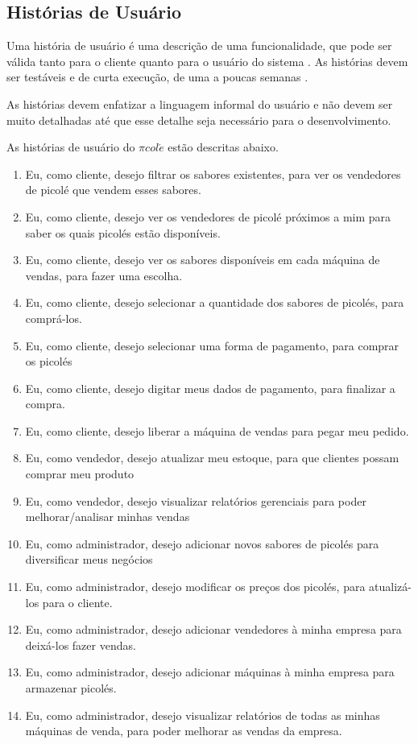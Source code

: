 \subsection{Histórias de Usuário}
\label{sec:historias}

Uma história de usuário é uma descrição de uma funcionalidade, que pode ser válida tanto para o cliente quanto para o usuário do sistema \cite{cohn2004user}. As histórias devem ser testáveis e de curta execução, de uma a poucas semanas \cite{breitman}.

As histórias devem enfatizar a linguagem informal do usuário e não devem ser muito detalhadas até que esse detalhe seja necessário para o desenvolvimento. \cite{cohn2004advantages}

As histórias de usuário do $\pi col\acute{e}$ estão descritas abaixo.

\begin{enumerate}
\item Eu, como cliente, desejo filtrar os sabores existentes, para ver os vendedores de picolé que vendem esses sabores.
\item Eu, como cliente, desejo ver os vendedores de picolé próximos a mim para saber os quais picolés estão disponíveis.
\item Eu, como cliente, desejo ver os sabores disponíveis em cada máquina de vendas, para fazer uma escolha.
\item Eu, como cliente, desejo selecionar a quantidade dos sabores de picolés, para comprá-los.
\item Eu, como cliente, desejo selecionar uma forma de pagamento, para comprar os picolés
\item Eu, como cliente, desejo digitar meus dados de pagamento, para finalizar a compra.
\item Eu, como cliente, desejo liberar a máquina de vendas para pegar meu pedido.

\item Eu, como vendedor, desejo atualizar meu estoque, para que clientes possam comprar meu produto
\item Eu, como vendedor, desejo visualizar relatórios gerenciais para poder melhorar/analisar minhas vendas

\item Eu, como administrador, desejo adicionar novos sabores de picolés para diversificar meus negócios
\item Eu, como administrador, desejo modificar os preços dos picolés, para atualizá-los para o cliente.
\item Eu, como administrador, desejo adicionar vendedores à minha empresa para deixá-los fazer vendas.
\item Eu, como administrador, desejo adicionar máquinas à minha empresa para armazenar picolés.
\item Eu, como administrador, desejo visualizar relatórios de todas as minhas máquinas de venda, para poder melhorar as vendas da empresa.\end{enumerate}


